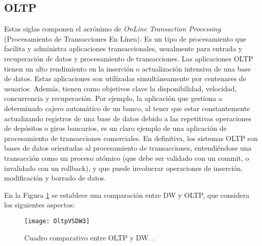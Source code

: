 \documentclass[a4paper,11pt]{article}
\begin{document}
    
    \subsection{OLTP}
    
    Estas siglas componen el acrónimo de \textit{OnLine Transaction Processing} (Procesamiento de Transacciones En Línea). Es un tipo
    de procesamiento que facilita y administra aplicaciones transaccionales, usualmente para entrada y recuperación de datos y procesamiento de
    transacciones.
    Las aplicaciones OLTP tienen un alto rendimiento en la inserción o actualización intensiva de una base de datos. Estas aplicaciones son utilizadas
    simultáneamente por centenares de usuarios. Además, tienen como objetivos clave la disponibilidad, velocidad, concurrencia y recuperación.
    Por ejemplo, la aplicación que gestiona a determinado cajero automático de un banco, al tener que estar constantemente actualizando registros de una
    base de datos debido a las repetitivas operaciones de depósitos o giros bancarios, es un claro ejemplo de una aplicación de procesamiento de
    transacciones comerciales.
    En definitiva, los sistemas OLTP son bases de datos orientadas al procesamiento de transacciones, entendiéndose una transacción como un proceso
    atómico (que debe ser validado con un commit, o invalidado con un rollback), y que puede involucrar operaciones de inserción, modificación y
    borrado de datos.\par
    
    En la Figura \ref{oltp_vs_olap} se establece una comparación entre DW y OLTP, que considera los siguientes aspectos:
    
    \begin{figure}
      \begin{center}
        \texttt{[image: OltpVSDW3]}
        \caption{Cuadro comparativo entre OLTP y DW. \cite[p.~42]{hefestov2}.}
        \label{oltp_vs_olap}
      \end{center}
    \end{figure}
    
\end{document}
